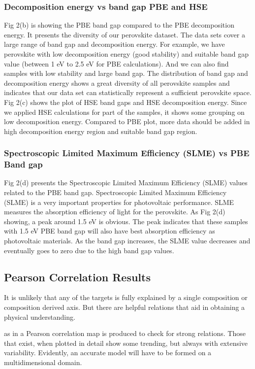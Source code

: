 \documentclass[twoside,twocolumn,9pt]{article}
\begin{document}
    \subsubsection*{Decomposition energy vs band gap PBE and HSE}
    Fig 2(b) is showing the PBE band gap compared to the PBE decomposition
    energy. It presents the diversity of our perovskite dataset. The data
    sets cover a large range of band gap and decomposition energy. For
    example, we have perovskite with low decomposition energy (good
    stability) and suitable band gap value (between 1 eV to 2.5 eV for PBE
    calculations). And we can also find samples with low stability and
    large band gap. The distribution of band gap and decomposition energy
    shows a great diversity of all perovskite samples and indicates that
    our data set can statistically represent a sufficient perovskite
    space.  Fig 2(c) shows the plot of HSE band gaps and HSE decomposition
    energy. Since we applied HSE calculations for part of the samples, it
    shows some grouping on low decomposition energy. Compared to PBE plot,
    more data should be added in high decomposition energy region and
    suitable band gap region.
    \subsubsection*{Spectroscopic Limited Maximum Efficiency (SLME) vs PBE Band gap}
    Fig 2(d) presents the Spectroscopic Limited Maximum Efficiency (SLME)
    values related to the PBE band gap. Spectroscopic Limited Maximum
    Efficiency (SLME) is a very important properties for photovoltaic
    performance. SLME measures the absorption efficiency of light for the
    perovskite. As Fig 2(d) showing, a peak around 1.5 eV is obvious. The
    peak indicates that these samples with 1.5 eV PBE band gap will also
    have best absorption efficiency as photovoltaic materials. As the band
    gap increases, the SLME value decreases and eventually goes to zero
    due to the high band gap values.

    \subsection*{Pearson Correlation Results}
    It is unlikely that any of the targets is fully explained by a single
    composition or composition derived axis. But there are helpful
    relations that aid in obtaining a physical understanding.

    as in a Pearson correlation map is produced to check for strong
    relations. Those that exist, when plotted in detail show some
    trending, but always with extensive variability. Evidently, an
    accurate model will have to be formed on a multidimensional
    domain.
\end{document}
